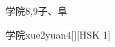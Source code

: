\begin{entry}{学院}{8,9}{⼦、⾩}
  \begin{phonetics}{学院}{xue2yuan4}[][HSK 1]
  \end{phonetics}
\end{entry}
